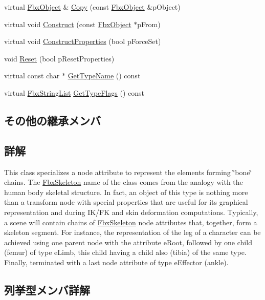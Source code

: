 \begin{DoxyCompactItemize}
\item 
virtual \hyperlink{class_fbx_object}{Fbx\+Object} \& \hyperlink{class_fbx_skeleton_a86ed7d693e2f77267a7e07c0db5023d7}{Copy} (const \hyperlink{class_fbx_object}{Fbx\+Object} \&p\+Object)
\item 
virtual void \hyperlink{class_fbx_skeleton_a76c2cdc12c50e753bf2510aa9c18c594}{Construct} (const \hyperlink{class_fbx_object}{Fbx\+Object} $\ast$p\+From)
\item 
virtual void \hyperlink{class_fbx_skeleton_aa1e8d4dbe577415b4e00914ae75d46a0}{Construct\+Properties} (bool p\+Force\+Set)
\item 
void \hyperlink{class_fbx_skeleton_a1ffc5d46440a35d2ddfa75f20918c1b4}{Reset} (bool p\+Reset\+Properties)
\item 
virtual const char $\ast$ \hyperlink{class_fbx_skeleton_a95bceb7989084e51a450525b4f57698b}{Get\+Type\+Name} () const
\item 
virtual \hyperlink{class_fbx_string_list}{Fbx\+String\+List} \hyperlink{class_fbx_skeleton_a8407f2dbece8af886d80b5a024626d54}{Get\+Type\+Flags} () const
\end{DoxyCompactItemize}
\subsection*{その他の継承メンバ}


\subsection{詳解}
This class specializes a node attribute to represent the elements forming \char`\"{}bone\char`\"{} chains. The \hyperlink{class_fbx_skeleton}{Fbx\+Skeleton} name of the class comes from the analogy with the human body skeletal structure. In fact, an object of this type is nothing more than a transform node with special properties that are useful for its graphical representation and during I\+K/\+FK and skin deformation computations. Typically, a scene will contain chains of \hyperlink{class_fbx_skeleton}{Fbx\+Skeleton} node attributes that, together, form a skeleton segment. For instance, the representation of the leg of a character can be achieved using one parent node with the attribute e\+Root, followed by one child (femur) of type e\+Limb, this child having a child also (tibia) of the same type. Finally, terminated with a last node attribute of type e\+Effector (ankle). 

\subsection{列挙型メンバ詳解}
\mbox{\label{class_fbx_skeleton_ae067f8fec201e5e3572f039e37ee1c6b}} 
